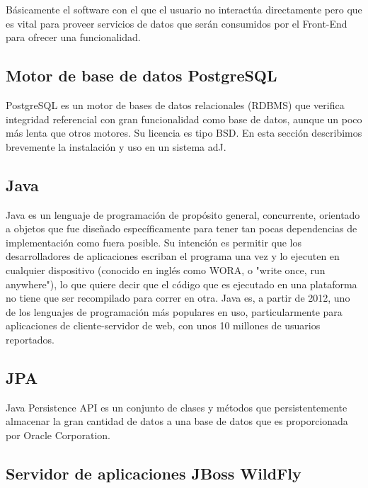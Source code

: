 Básicamente el software con el que el usuario no interactúa directamente pero que es vital para proveer servicios de datos que serán consumidos por el Front-End para ofrecer una funcionalidad.

\subsection{Motor de base de datos PostgreSQL}

PostgreSQL es un motor de bases de datos relacionales (RDBMS) que verifica integridad referencial con gran funcionalidad como base de datos, aunque un poco más lenta que otros motores. Su licencia es tipo BSD. En esta sección describimos brevemente la instalación y uso en un sistema adJ.

\subsection{Java}

Java es un lenguaje de programación de propósito general, concurrente, orientado a objetos que fue diseñado específicamente para tener tan pocas dependencias de implementación como fuera posible. Su intención es permitir que los desarrolladores de aplicaciones escriban el programa una vez y lo ejecuten en cualquier dispositivo (conocido en inglés como WORA, o "write once, run anywhere"), lo que quiere decir que el código que es ejecutado en una plataforma no tiene que ser recompilado para correr en otra. Java es, a partir de 2012, uno de los lenguajes de programación más populares en uso, particularmente para aplicaciones de cliente-servidor de web, con unos 10 millones de usuarios reportados.

\subsection{JPA}

Java Persistence API es un conjunto de clases y métodos que persistentemente almacenar la gran cantidad de datos a una base de datos que es proporcionada por Oracle Corporation.

\subsection{Servidor de aplicaciones JBoss WildFly}


